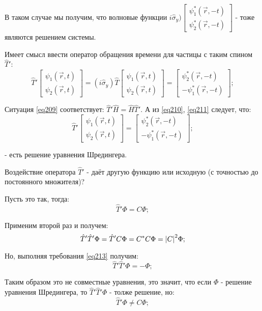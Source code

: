\documentclass[a4paper, 14pt, russian]{article}
\newcommand{\be}{\begin{equation}}
\newcommand{\ee}{\end{equation}}
\begin{document}
	В таком случае мы получим, что волновые функции $i\hat{\sigma}_y)
	\begin{bmatrix} \psi_1^{*}(\vec r, -t)\\ \psi_2^{*}(\vec r, -t)\end{bmatrix}$ - тоже
	являются решением системы.

	Имеет смысл ввести оператор обращения времени для частицы с таким спином $\hat{T}'$:
	\be
		\label{eq211}
		\hat{T}' \begin{bmatrix} \psi_1(\vec r, t)\\ \psi_2(\vec r, t)\end{bmatrix}
			= (i \hat{\sigma}_y) \hat{T} \begin{bmatrix} \psi_1(\vec r, t)\\ \psi_2(\vec r, t)\end{bmatrix}
			= \begin{bmatrix} \psi_2^{*}(\vec r, -t)\\ -\psi_1^{*}(\vec r, -t)\end{bmatrix};
	\ee

	Ситуация \ref{eq209} соответствует: $\hat{T}' \hat{H} = \hat{H} \hat{T}'$. 
	А из  \ref{eq210}, \ref{eq211} следует, что:
	\be
		\label{eq213}
		\hat{T}' \begin{bmatrix} \psi_1(\vec r, t)\\ \psi_2(\vec r, t)\end{bmatrix}
		=  \begin{bmatrix} \psi_2^{*}(\vec r, -t)\\ -\psi_1^{*}(\vec r, -t)\end{bmatrix};
	\ee
	 
	-  есть решение уравнения Шредингера. 

	\begin{tcolorbox}
		Воздействие оператора $\hat{T}'$ - даёт другую функцию или исходную (с точностью до
		постоянного множителя)?
	\end{tcolorbox}

	Пусть это так, тогда:
	\be
		\label{eq214}
		\hat{T}' \Phi = C \Phi;
	\ee

	Применим второй раз и получем:
	\be
		\label{eq215}
		\hat{T}' \hat{T}' \Phi = \hat{T}' C \Phi = C^{*} C \Phi = \abs{C}^2 \Phi;
	\ee


	Но, выполняя требования \ref{eq213} получим:
	\be
		\label{eq216}
		\hat{T}' \hat{T}' \Phi = - \Phi;
	\ee

	Таким образом это не совместные уравнения, это значит, что если 
	$\Phi$ - решение уравнения Шредингера, то $\hat{T}' \hat{T}' \Phi$ - 
	толже решение, но:
	\be
		\label{eq217}
		\hat{T}' \Phi \neq C \Phi;
	\ee
\end{document}
